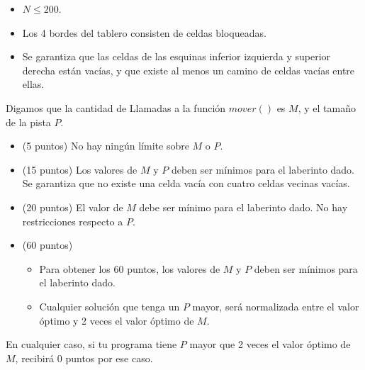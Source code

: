 \documentclass[12pt]{scrartcl}
\begin{document}
        \begin{itemize}
            \item $N \le 200$.
            \item Los 4 bordes del tablero consisten de celdas bloqueadas.
            \item Se garantiza que las celdas de las esquinas inferior izquierda y superior derecha están vacías, y que existe al menos un camino de celdas vacías entre ellas.
        \end{itemize}
        

    Digamos que la cantidad de Llamadas a la función $mover()$ es $M$, y el tamaño de la pista $P$.

    \begin{itemize}
        \item (5 puntos) No hay ningún límite sobre $M$ o $P$.
        \item (15 puntos) Los valores de $M$ y $P$ deben ser mínimos para el laberinto dado. Se garantiza que no existe una celda vacía con cuatro celdas vecinas vacías.
        \item (20 puntos) El valor de $M$ debe ser mínimo para el laberinto dado. No hay restricciones respecto a $P$.
        \item (60 puntos) 
        \begin{itemize}
            \item Para obtener los 60 puntos, los valores de $M$ y $P$ deben ser mínimos para el laberinto dado.
            \item Cualquier solución que tenga un $P$ mayor, será normalizada entre el valor óptimo y 2 veces el valor óptimo de $M$.
        \end{itemize}
    \end{itemize}
    En cualquier caso, si tu programa tiene $P$ mayor que 2 veces el valor óptimo de $M$, recibirá 0 puntos por ese caso.
\end{document}
